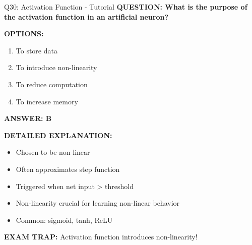 \documentclass[8pt]{beamer}
\begin{document}
	\begin{frame}{Q30: Activation Function - Tutorial}
		\fontsize{6.5}{7.5}\selectfont
		\textbf{QUESTION: What is the purpose of the activation function in an artificial neuron?}
		
		\vspace{0.1cm}
		\textbf{OPTIONS:}
		\begin{enumerate}
			\item To store data
			\item To introduce non-linearity
			\item To reduce computation
			\item To increase memory
		\end{enumerate}
		
		\vspace{0.1cm}
		\textcolor{myblue}{\textbf{ANSWER: B}}
		
		\vspace{0.1cm}
		\textbf{DETAILED EXPLANATION:}
		\begin{itemize}
			\item Chosen to be non-linear
			\item Often approximates step function
			\item Triggered when net input > threshold
			\item Non-linearity crucial for learning non-linear behavior
			\item Common: sigmoid, tanh, ReLU
		\end{itemize}
		
		\vspace{0.1cm}
		\textcolor{myred}{\textbf{EXAM TRAP:}} Activation function introduces \textcolor{myblue}{non-linearity}!
	\end{frame}
	
\end{document}
